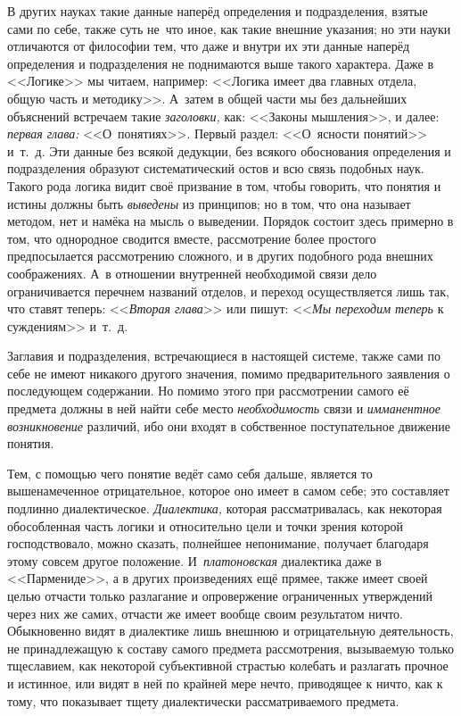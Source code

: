 В других науках такие данные наперёд определения и подразделения, взятые
сами по себе, также суть не~что иное, как такие внешние указания; но эти
науки отличаются от философии тем, что даже и внутри их эти данные наперёд
определения и подразделения не поднимаются выше такого характера. Даже в
<<Логике>> мы читаем, например: <<Логика имеет два главных отдела, общую часть
и методику>>. А~затем в общей части мы без дальнейших объяснений встречаем
такие {\em заголовки,} как: <<Законы мышления>>, и далее:
{\em первая глава:} <<О~понятиях>>. Первый раздел: <<О~ясности понятий>>
и~т.~д. Эти данные без всякой дедукции, без всякого
обоснования определения и подразделения образуют систематический остов и
всю связь подобных наук. Такого рода логика видит своё призвание в том,
чтобы говорить, что понятия и истины должны быть
{\em выведены} из принципов; но в том, что она называет
методом, нет и намёка на мысль о выведении. Порядок состоит здесь примерно
в том, что однородное сводится вместе, рассмотрение более простого
предпосылается рассмотрению сложного, и в других подобного рода внешних
соображениях. А~в отношении внутренней необходимой связи дело
ограничивается перечнем названий отделов, и переход осуществляется лишь
так, что ставят теперь: <<{\em Вторая глава}>> или пишут:
<<{\em Мы переходим теперь} к суждениям>> и~т.~д.

Заглавия и подразделения, встречающиеся в настоящей системе, также сами по
себе не имеют никакого другого значения, помимо предварительного заявления
о последующем содержании. Но помимо этого при рассмотрении самого её
предмета должны в ней найти себе место {\em необходимость} связи и
{\em имманентное возникновение} различий, ибо они
входят в собственное поступательное движение понятия.

Тем, с помощью чего понятие ведёт само себя дальше, является то
вышенамеченное отрицательное, которое оно имеет в самом себе; это
составляет подлинно диалектическое. {\em Диалектика,}
которая рассматривалась, как некоторая обособленная часть логики и
относительно цели и точки зрения которой господствовало, можно сказать,
полнейшее непонимание, получает благодаря этому совсем другое положение.
И~{\em платоновская} диалектика даже в <<Пармениде>>, а в
других произведениях ещё прямее, также имеет своей целью отчасти только
разлагание и опровержение ограниченных утверждений через них же самих,
отчасти же имеет вообще своим результатом ничто. Обыкновенно видят в
диалектике лишь внешнюю и отрицательную деятельность, не принадлежащую к
составу
самого предмета рассмотрения, вызываемую только тщеславием, как некоторой
субъективной страстью колебать и разлагать прочное и истинное, или видят в
ней по крайней мере нечто, приводящее к ничто, как к тому, что показывает
тщету диалектически рассматриваемого предмета.

